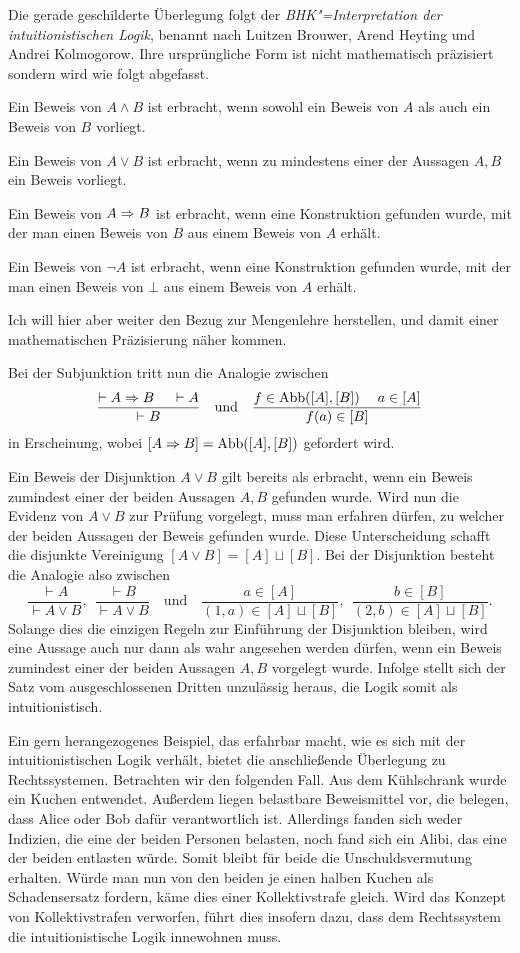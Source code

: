 Die gerade geschilderte Überlegung folgt der \emph{BHK"=Interpretation
der intuitionistischen Logik}, benannt nach Luitzen Brouwer, Arend
Heyting und Andrei Kolmogorow. Ihre ursprüngliche Form ist nicht
mathematisch präzisiert sondern wird wie folgt abgefasst.

Ein Beweis von $A\land B$ ist erbracht, wenn sowohl ein Beweis
von $A$ als auch ein Beweis von $B$ vorliegt.

Ein Beweis von $A\lor B$ ist erbracht, wenn zu mindestens einer der Aussagen
$A,B$ ein Beweis vorliegt.

Ein Beweis von $A\Rightarrow B$ ist erbracht, wenn eine Konstruktion
gefunden wurde, mit der man einen Beweis von $B$ aus einem Beweis
von $A$ erhält.

Ein Beweis von $\lnot A$ ist erbracht, wenn eine Konstruktion gefunden wurde,
mit der man einen Beweis von $\bot$ aus einem Beweis von $A$ erhält.

Ich will hier aber weiter den Bezug zur Mengenlehre herstellen, und damit
einer mathematischen Präzisierung näher kommen.

Bei der Subjunktion tritt nun die Analogie zwischen
\[\dfrac{\vdash A\Rightarrow B\quad\;\vdash A}{\vdash B}\quad\text{und}\quad
\dfrac{f\in\mathrm{Abb}([A],[B])\quad\; a\in [A]}{f(a)\in [B]}\]
in Erscheinung, wobei $[A\Rightarrow B] = \mathrm{Abb}([A],[B])$ gefordert
wird.

Ein Beweis der Disjunktion $A\lor B$ gilt bereits als erbracht,
wenn ein Beweis zumindest einer der beiden Aussagen $A,B$ gefunden
wurde. Wird nun die Evidenz von $A\lor B$ zur Prüfung vorgelegt, muss
man erfahren dürfen, zu welcher der beiden Aussagen der Beweis gefunden
wurde. Diese Unterscheidung schafft die disjunkte Vereinigung
$[A\lor B] = [A]\sqcup [B]$. Bei der Disjunktion besteht die Analogie also zwischen
\[\dfrac{\vdash A}{\vdash A\lor B},\;\,\dfrac{\vdash B}{\vdash A\lor B}\quad\text{und}\quad
\dfrac{a\in [A]}{(1,a)\in [A]\sqcup [B]},\;\,\dfrac{b\in [B]}{(2,b)\in [A]\sqcup [B]}.\]
Solange dies die einzigen Regeln zur Einführung der Disjunktion
bleiben, wird eine Aussage auch nur dann als wahr angesehen werden
dürfen, wenn ein Beweis zumindest einer der beiden Aussagen $A,B$
vorgelegt wurde. Infolge stellt sich der Satz vom ausgeschlossenen
Dritten unzulässig heraus, die Logik somit als intuitionistisch.

Ein gern herangezogenes Beispiel, das erfahrbar macht, wie es sich mit
der intuitionistischen Logik verhält, bietet die anschließende Überlegung
zu Rechtssystemen. Betrachten wir den folgenden Fall.
Aus dem Kühlschrank wurde ein Kuchen entwendet. Außerdem liegen
belastbare Beweismittel vor, die belegen, dass Alice oder Bob
dafür verantwortlich ist. Allerdings fanden sich weder Indizien,
die eine der beiden Personen belasten, noch fand sich ein Alibi, das
eine der beiden entlasten würde. Somit bleibt für beide die
Unschuldsvermutung erhalten.
Würde man nun von den beiden je einen halben Kuchen als Schadensersatz
fordern, käme dies einer Kollektivstrafe gleich. Wird das Konzept
von Kollektivstrafen verworfen, führt dies insofern dazu, dass dem
Rechtssystem die intuitionistische Logik innewohnen muss.

